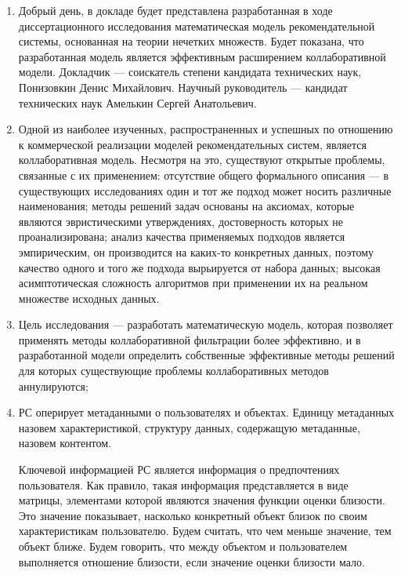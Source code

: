 \documentclass[a4paper,11pt]{proc}
\begin{document}
\scriptsize{
\begin{enumerate}

%
%

\item Добрый день, в докладе будет представлена разработанная в ходе диссертационного исследования
	математическая модель рекомендательной системы, основанная на теории нечетких
	множеств. Будет показана, что разработанная модель является эффективным расширением коллаборативной
	модели. Докладчик --- соискатель степени кандидата технических наук, Понизовкин Денис Михайлович.
	Научный руководитель --- кандидат технических наук Амелькин Сергей Анатольевич.

\item Одной из наиболее изученных, распространенных и успешных по отношению к коммерческой реализации
	моделей рекомендательных систем, является коллаборативная
	модель. Несмотря на это, существуют открытые
	проблемы, связанные с их применением: отсутствие общего формального
	описания --- в существующих исследованиях один и
	тот же подход может носить различные наименования;
	методы решений задач основаны на аксиомах, которые являются эвристическими утверждениях,
	достоверность которых не проанализирована;
	анализ качества применяемых подходов является
	эмпирическим, он производится на каких-то конкретных данных, поэтому
	качество одного и того же подхода вырьируется от набора данных;
	высокая асимптотическая сложность алгоритмов при применении их на реальном
	множестве исходных данных.

\item Цель исследования --- разработать математическую модель, которая
	позволяет применять методы коллаборативной фильтрации более эффективно,
	и в разработанной модели определить собственные эффективные методы решений
	для которых существующие проблемы коллаборативных методов аннулируются;

\item РС оперирует метаданными о пользователях и объектах. Единицу метаданных
	назовем характеристикой, структуру данных, содержащую метаданные, назовем
	контентом.

	Ключевой информацией РС является информация о предпочтениях пользователя.
	Как правило, такая информация представляется в виде матрицы, элементами
	которой являются значения функции оценки близости. Это значение показывает,
	насколько конкретный объект близок по своим характеристикам пользователю.
	Будем считать, что чем меньше значение, тем объект ближе. Будем говорить,
		что между объектом и пользователем выполняется отношение близости,
		если значение оценки близости мало.


\end{enumerate}}
\end{document}
